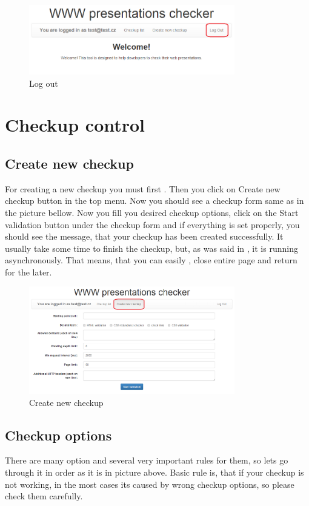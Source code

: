 \documentclass[12pt,a4paper]{article}
\begin{document}
\begin{figure}[H]
    \centering
    \includegraphics[width=0.8\textwidth]{pictures/logout.png}
		\caption{Log out}
		\label{fig:logout}
\end{figure}

\section{Checkup control}
\subsection{Create new checkup} \label{create}
For creating a new checkup you must first . Then you click on Create new checkup button in the top menu. Now you should see a checkup form same as in the picture bellow. Now you fill you desired checkup options, click on the Start validation button under the checkup form and if everything is set properly, you should see the message, that your checkup has been created successfully. It usually take some time to finish the checkup, but, as was said in , it is running asynchronously. That means, that you can easily , close entire page and return for the  later.

\begin{figure}[H]
    \centering
    \includegraphics[width=0.8\textwidth]{pictures/newcheckup.png}
		\caption{Create new checkup}
		\label{fig:newcheckup}
\end{figure}

\subsection{Checkup options} \label{options}
There are many option and several very important rules for them, so lets go through it in order as it is in picture above. Basic rule is, that if your checkup is not working, in the most cases its caused by wrong checkup options, so please check them carefully.
\end{document}
